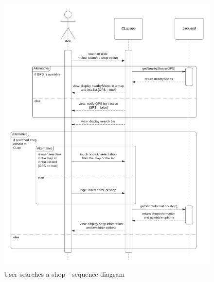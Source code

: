 \begin{figure}[h!]
    \centering
    \includegraphics[width=\textwidth]{Images/sequencediagrams/UsersearchesashopSD.png}
    \caption{\label{fig:usersearchesshop}User searches a shop - sequence diagram}
\end{figure}

